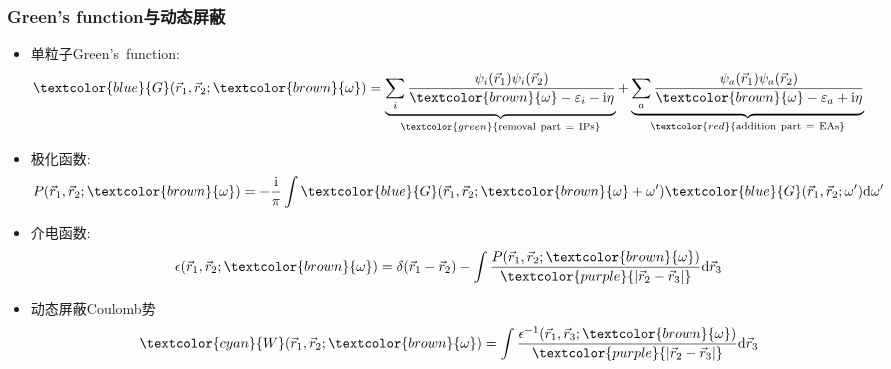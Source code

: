 \frame
{
	\frametitle{\textrm{Green's function}与动态屏蔽}
	\vspace*{-15pt}
	\begin{itemize}
		\item 单粒子\textrm{Green's~function}:
	\begin{displaymath}
		\textcolor{blue}{G}(\vec r_1,\vec r_2;\textcolor{brown}{\omega})=\underbrace{\sum_i\dfrac{\psi_i(\vec r_1)\psi_i(\vec r_2)}{\textcolor{brown}{\omega}-\varepsilon_i-\mathrm{i}\eta}}_{\textcolor{green}{\mathrm{removal~part~=~IPs}}}+\underbrace{\sum_a\dfrac{\psi_a(\vec r_1)\psi_a(\vec r_2)}{\textcolor{brown}{\omega}-\varepsilon_a+\mathrm{i}\eta}}_{\textcolor{red}{\mathrm{addition~part~=~EAs}}}
	\end{displaymath}
\item 极化函数:
	\begin{displaymath}
		P(\vec r_1,\vec r_2;\textcolor{brown}{\omega})=-\dfrac{\mathrm{i}}{\pi}\int\textcolor{blue}{G}(\vec r_1,\vec r_2;\textcolor{brown}{\omega}+\omega^{\prime})\textcolor{blue}{G}(\vec r_1,\vec r_2;\omega^{\prime})\mathrm{d}\omega^{\prime}
	\end{displaymath}
\item 介电函数:
	\begin{displaymath}
		\epsilon(\vec r_1,\vec r_2;\textcolor{brown}{\omega})=\delta(\vec r_1-\vec r_2)-\int\dfrac{P(\vec r_1,\vec r_2;\textcolor{brown}{\omega})}{\textcolor{purple}{|\vec r_2-\vec r_3|}}\mathrm{d}\vec r_3
	\end{displaymath}
\item 动态屏蔽\textrm{Coulomb}势
	\begin{displaymath}
		\textcolor{cyan}{W}(\vec r_1,\vec r_2;\textcolor{brown}{\omega})=\int\dfrac{\epsilon^{-1}(\vec r_1,\vec r_3;\textcolor{brown}{\omega})}{\textcolor{purple}{|\vec r_2-\vec r_3|}}\mathrm{d}\vec r_3
	\end{displaymath}
	\end{itemize}
}

